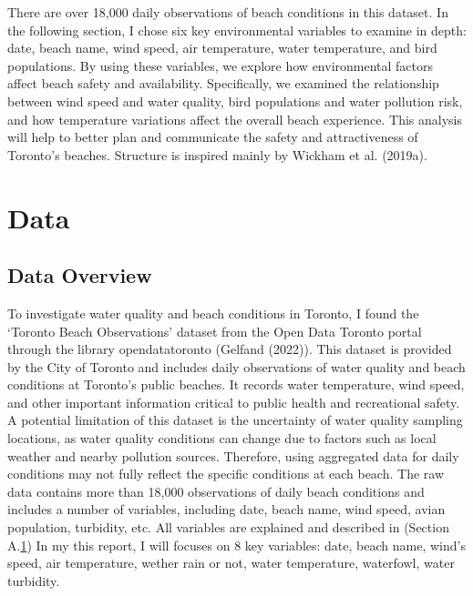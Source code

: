 \documentclass[
  letterpaper,
  DIV=11,
  numbers=noendperiod]{scrartcl}
\begin{document}
There are over 18,000 daily observations of beach conditions in this
dataset. In the following section, I chose six key environmental
variables to examine in depth: date, beach name, wind speed, air
temperature, water temperature, and bird populations. By using these
variables, we explore how environmental factors affect beach safety and
availability. Specifically, we examined the relationship between wind
speed and water quality, bird populations and water pollution risk, and
how temperature variations affect the overall beach experience. This
analysis will help to better plan and communicate the safety and
attractiveness of Toronto's beaches. Structure is inspired mainly by
Wickham et al. (2019a).

\newpage

\section{Data}\label{sec-data}

\subsection{Data Overview}\label{sec1-data}

To investigate water quality and beach conditions in Toronto, I found
the `Toronto Beach Observations' dataset from the Open Data Toronto
portal through the library opendatatoronto (Gelfand (2022)). This
dataset is provided by the City of Toronto and includes daily
observations of water quality and beach conditions at Toronto's public
beaches. It records water temperature, wind speed, and other important
information critical to public health and recreational safety. A
potential limitation of this dataset is the uncertainty of water quality
sampling locations, as water quality conditions can change due to
factors such as local weather and nearby pollution sources. Therefore,
using aggregated data for daily conditions may not fully reflect the
specific conditions at each beach. The raw data contains more than
18,000 observations of daily beach conditions and includes a number of
variables, including date, beach name, wind speed, avian population,
turbidity, etc. All variables are explained and described in (Section
A.\hyperref[appendix-a.1]{1}) In my this report, I will focuses on 8 key
variables: date, beach name, wind's speed, air temperature, wether rain
or not, water temperature, waterfowl, water turbidity.
\end{document}
